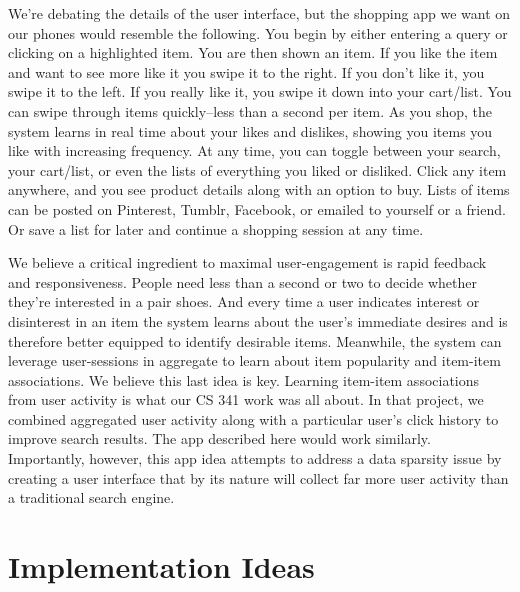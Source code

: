 \documentclass[10pt]{article}
\begin{document}
We're debating the details of the user interface, but the shopping app we want
on our phones would resemble the following. You begin by either entering a
query or clicking on a highlighted item. You are then shown an item. If you
like the item and want to see more like it you swipe it to the right. If you
don't like it, you swipe it to the left. If you really like it, you swipe it
down into your cart/list. You can swipe through items quickly--less than a
second per item. As you shop, the system learns in real time about your likes
and dislikes, showing you items you like with increasing frequency. At any
time, you can toggle between your search, your cart/list, or even the lists of
everything you liked or disliked. Click any item anywhere, and you see product
details along with an option to buy. Lists of items can be posted on Pinterest,
Tumblr, Facebook, or emailed to yourself or a friend. Or save a list for later
and continue a shopping session at any time.

We believe a critical ingredient to maximal user-engagement is rapid feedback
and responsiveness. People need less than a second or two to decide whether
they're interested in a pair shoes. And every time a user indicates interest or
disinterest in an item the system learns about the user's immediate desires and
is therefore better equipped to identify desirable items. Meanwhile, the system
can leverage user-sessions in aggregate to learn about item popularity and
item-item associations.  We believe this last idea is key. Learning item-item
associations from user activity is what our CS 341 work was all about. In that
project, we combined aggregated user activity along with a particular user's
click history to improve search results. The app described here would work
similarly. Importantly, however, this app idea attempts to address a data
sparsity issue by creating a user interface that by its nature will collect far
more user activity than a traditional search engine.

\section*{Implementation Ideas}
\end{document}
